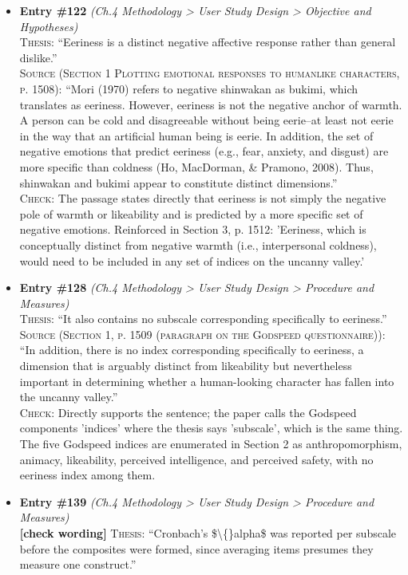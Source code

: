 \documentclass[11pt, a4paper]{article}
\begin{document}
\begin{itemize}[leftmargin=1.2em,itemsep=4pt]
\item \textbf{Entry \#122} \textit{(Ch.4 Methodology > User Study Design > Objective and Hypotheses)}\\
\textsc{Thesis:} ``Eeriness is a distinct negative affective response rather than general dislike.''\\
\textsc{Source (Section 1 Plotting emotional responses to humanlike characters, p. 1508):} ``Mori (1970) refers to negative shinwakan as bukimi, which translates as eeriness. However, eeriness is not the negative anchor of warmth. A person can be cold and disagreeable without being eerie--at least not eerie in the way that an artificial human being is eerie. In addition, the set of negative emotions that predict eeriness (e.g., fear, anxiety, and disgust) are more specific than coldness (Ho, MacDorman, \& Pramono, 2008). Thus, shinwakan and bukimi appear to constitute distinct dimensions.''\\
\textsc{Check:} The passage states directly that eeriness is not simply the negative pole of warmth or likeability and is predicted by a more specific set of negative emotions. Reinforced in Section 3, p. 1512: 'Eeriness, which is conceptually distinct from negative warmth (i.e., interpersonal coldness), would need to be included in any set of indices on the uncanny valley.'
\item \textbf{Entry \#128} \textit{(Ch.4 Methodology > User Study Design > Procedure and Measures)}\\
\textsc{Thesis:} ``It also contains no subscale corresponding specifically to eeriness.''\\
\textsc{Source (Section 1, p. 1509 (paragraph on the Godspeed questionnaire)):} ``In addition, there is no index corresponding specifically to eeriness, a dimension that is arguably distinct from likeability but nevertheless important in determining whether a human-looking character has fallen into the uncanny valley.''\\
\textsc{Check:} Directly supports the sentence; the paper calls the Godspeed components 'indices' where the thesis says 'subscale', which is the same thing. The five Godspeed indices are enumerated in Section 2 as anthropomorphism, animacy, likeability, perceived intelligence, and perceived safety, with no eeriness index among them.
\item \textbf{Entry \#139} \textit{(Ch.4 Methodology > User Study Design > Procedure and Measures)}\\
\textcolor{partialorange}{\textbf{[check wording]}} \textsc{Thesis:} ``Cronbach's \$\textbackslash\{\}alpha\$ was reported per subscale before the composites were formed, since averaging items presumes they measure one construct.''\\

\end{itemize}
\end{document}
